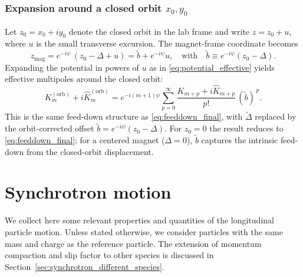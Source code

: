 \subsection{Expansion around a closed orbit \(x_0, y_0\)}
Let \(z_0 = x_0 + i y_0\) denote the closed orbit in the lab frame and write \(z = z_0 + u\), where \(u\) is the small transverse excursion. The magnet-frame coordinate becomes
\begin{equation}
  z_{\mathrm{mag}} = e^{-i\psi}\,(z_0 - \Delta + u) = \tilde b + e^{-i\psi} u,
  \quad \text{with} \quad \tilde b \equiv e^{-i\psi}(z_0 - \Delta).
\end{equation}
Expanding the potential in powers of \(u\) as in \eqref{eq:potential_effective} yields effective multipoles around the closed orbit:
\begin{equation}
  K_m^{(\mathrm{orb})} + i \hat K_m^{(\mathrm{orb})}
  = e^{-i (m+1)\psi} \sum_{p=0}^{\infty} \frac{K_{m+p} + i \hat K_{m+p}}{p!} \, (\tilde b)^{\,p}.
  \label{eq:feeddown_orbit}
\end{equation}
This is the same feed-down structure as \eqref{eq:feeddown_final}, with \(\tilde\Delta\) replaced by the orbit-corrected offset \(\tilde b = e^{-i\psi}(z_0 - \Delta)\). For \(z_0 = 0\) the result reduces to \eqref{eq:feeddown_final}; for a centered magnet (\(\Delta = 0\)), \(\tilde b\) captures the intrinsic feed-down from the closed-orbit displacement.




\chapter{Synchrotron motion}
\label{ch:synchmon}

We collect here some relevant properties and quantities of the longitudinal particle motion.
Unless stated otherwise, we consider particles with the same mass and charge as
the reference particle. The extension of momentum compaction and slip factor to
other species is discussed in Section~\ref{sec:synchrotron_different_species}.


